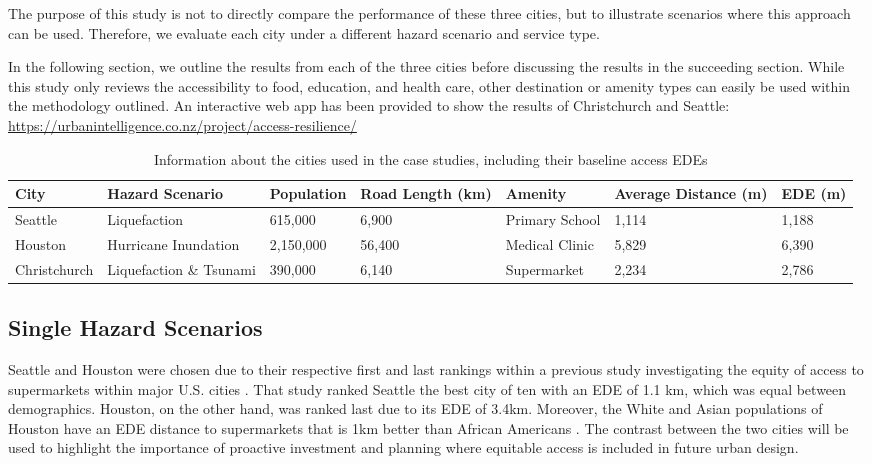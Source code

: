 \documentclass[review,3p,times,onecolumn,sort&compress,12pt]{elsarticle}
\let \cite \parencite
\begin{document}
The purpose of this study is not to directly compare the performance of these three cities, but to illustrate scenarios where this approach can be used.
Therefore, we evaluate each city under a different hazard scenario and service type.

In the following section, we outline the results from each of the three cities before discussing the results in the succeeding section.
While this study only reviews the accessibility to food, education, and health care, other destination or amenity types can easily be used within the methodology outlined.
An interactive web app has been provided to show the results of Christchurch and Seattle: \url{https://urbanintelligence.co.nz/project/access-resilience/}

\begin{table}[h!]
\small
\caption{Information about the cities used in the case studies, including their baseline access EDEs}
\label{tab: BAU_Results}
\begin{tabular}{p{1.8cm}|p{3.5cm}|R{1.8cm}|R{1cm}|p{2.25cm}|R{1.5cm}|R{1.5cm}}%
\hline
\textbf{City} & \textbf{Hazard Scenario} & \textbf{Population} & \textbf{Road Length (km)} & \textbf{Amenity} & \textbf{Average Distance (m)} & \textbf{EDE (m)} \\
\hline
Seattle & Liquefaction & 615,000 & 6,900 & Primary School & 1,114 & 1,188 \\
Houston & Hurricane Inundation & 2,150,000 & 56,400 & Medical Clinic & 5,829 & 6,390 \\
Christchurch & Liquefaction \& Tsunami & 390,000 & 6,140 & Supermarket & 2,234 & 2,786 \\
\hline
\end{tabular}
\end{table}

\subsection{Single Hazard Scenarios}
Seattle and Houston were chosen due to their respective first and last rankings within a previous study investigating the equity of access to supermarkets within major U.S. cities \cite{Logan2021-ineq}. 
That study ranked Seattle the best city of ten with an EDE of 1.1 km, which was equal between demographics. 
Houston, on the other hand, was ranked last due to its EDE of 3.4km.
Moreover, the White and Asian populations of Houston have an EDE distance to supermarkets that is 1km better than African Americans \cite{Logan2021-ineq}. 
The contrast between the two cities will be used to highlight the importance of proactive investment and planning where equitable access is included in future urban design.
\end{document}
